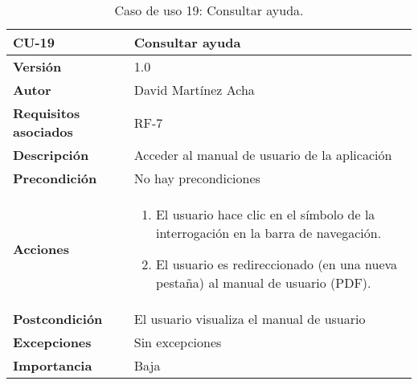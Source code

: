 \begin{table}[p]
	\centering
	\begin{tabularx}{\linewidth}{ p{} p{} }
		\toprule
		\textbf{CU-19}    & \textbf{Consultar ayuda}\\
		\toprule
		\textbf{Versión}              & 1.0    \\
		\textbf{Autor}                & David Martínez Acha \\
		\textbf{Requisitos asociados} & RF-7 \\
		\textbf{Descripción}          & Acceder al manual de usuario de la aplicación \\
		\textbf{Precondición}         & No hay precondiciones \\
		\textbf{Acciones}             &
		\begin{enumerate}
			\def\labelenumi{\arabic{enumi}.}
			\tightlist
			\item El usuario hace clic en el símbolo de la interrogación en la barra de navegación.
            \item El usuario es redireccionado (en una nueva pestaña) al manual de usuario (PDF).
		\end{enumerate}\\
		\textbf{Postcondición}        & El usuario visualiza el manual de usuario \\
		\textbf{Excepciones}          & Sin excepciones \\
		\textbf{Importancia}          & Baja \\
		\bottomrule
	\end{tabularx}
	\caption{Caso de uso 19: Consultar ayuda.}
\end{table}
